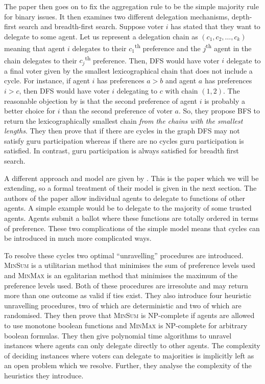\documentclass[11pt,a4paper, titlepage]{article}
\theoremstyle{definition}
\begin{document}
The paper then goes on to fix the aggregation rule to be the simple majority rule for binary issues. It then examines two different delegation mechanisms, depth-first search and breadth-first search.
Suppose voter $i$ has stated that they want to delegate to some agent. Let us represent a delegation chain as $(c_1, c_2, \ldots, c_k)$ meaning that agent $i$ delegates to their $c_1$\textsuperscript{th} preference and the $j$\textsuperscript{th} agent in the chain delegates to their $c_j$\textsuperscript{th} preference.
Then, DFS would have voter $i$ delegate to a final voter given by the smallest lexicographical chain that does not include a cycle. For instance, if agent $i$ has preferences $a > b$ and agent $a$ has preferences $i > c$, then DFS would have voter $i$ delegating to $c$ with chain $(1, 2)$.
The reasonable objection by \citeauthor{kotsialou} is that the second preference of agent $i$ is probably a better choice for $i$ than the second preference of voter $a$.
So, they propose BFS to return the lexicographically smallest chain \emph{from the chains with the smallest lengths}.
They then prove that if there are cycles in the graph DFS may not satisfy guru participation whereas if there are no cycles guru participation is satisfied. In contrast, guru participation is always satisfied for breadth first search.

A different approach and model are given by \citet{grandi}. This is the paper which we will be extending, so a formal treatment of their model is given in the next section.
The authors of the paper allow individual agents to delegate to functions of other agents. A simple example would be to delegate to the majority of some trusted agents.
Agents submit a ballot where these functions are totally ordered in terms of preference.
These two complications of the simple model means that cycles can be introduced in much more complicated ways.

To resolve these cycles two optimal ``unravelling'' procedures are introduced. \textsc{MinSum} is a utilitarian method that minimises the sum of preference levels used and \textsc{MinMax} is an egalitarian method that minimises the maximum of the preference levels used.
Both of these procedures are irresolute and may return more than one outcome as valid if ties exist.
They also introduce four heuristic unravelling procedures, two of which are deterministic and two of which are randomised.
They then prove that \textsc{MinSum} is NP-complete if agents are allowed to use monotone boolean functions  and \textsc{MinMax} is NP-complete for arbitrary boolean formulas.
They then give polynomial time algorithms to unravel instances where agents can only delegate directly to other agents.
The complexity of deciding instances where voters can delegate to majorities is implicitly left as an open problem which we resolve.
Further, they analyse the complexity of the heuristics they introduce.
\end{document}
